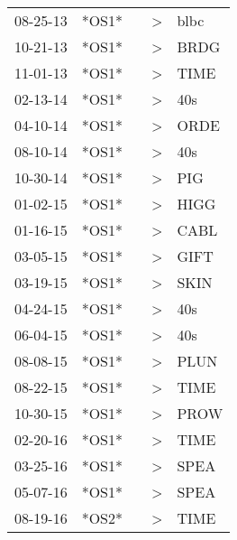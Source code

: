 \begin{supertabular}{p{0.07\textwidth}p{0.06\textwidth}p{0.02\textwidth}p{0.02\textwidth}p{0.06\textwidth}}
 08-25-13\textsuperscript{} &  *OS1* &   &  \textgreater &  blbc\textsuperscript{} \\
 10-21-13\textsuperscript{} &  *OS1* &   &  \textgreater &  BRDG\textsuperscript{} \\
 11-01-13\textsuperscript{} &  *OS1* &   &  \textgreater &  TIME\textsuperscript{} \\
 02-13-14\textsuperscript{} &  *OS1* &   &  \textgreater &   40s\textsuperscript{} \\
 04-10-14\textsuperscript{} &  *OS1* &   &  \textgreater &  ORDE\textsuperscript{} \\
 08-10-14\textsuperscript{} &  *OS1* &   &  \textgreater &   40s\textsuperscript{} \\
 10-30-14\textsuperscript{} &  *OS1* &   &  \textgreater &   PIG\textsuperscript{} \\
 01-02-15\textsuperscript{} &  *OS1* &   &  \textgreater &  HIGG\textsuperscript{} \\
 01-16-15\textsuperscript{} &  *OS1* &   &  \textgreater &  CABL\textsuperscript{} \\
 03-05-15\textsuperscript{} &  *OS1* &   &  \textgreater &  GIFT\textsuperscript{} \\
 03-19-15\textsuperscript{} &  *OS1* &   &  \textgreater &  SKIN\textsuperscript{} \\
 04-24-15\textsuperscript{} &  *OS1* &   &  \textgreater &   40s\textsuperscript{} \\
 06-04-15\textsuperscript{} &  *OS1* &   &  \textgreater &   40s\textsuperscript{} \\
 08-08-15\textsuperscript{} &  *OS1* &   &  \textgreater &  PLUN\textsuperscript{} \\
 08-22-15\textsuperscript{} &  *OS1* &   &  \textgreater &  TIME\textsuperscript{} \\
 10-30-15\textsuperscript{} &  *OS1* &   &  \textgreater &  PROW\textsuperscript{} \\
 02-20-16\textsuperscript{} &  *OS1* &   &  \textgreater &  TIME\textsuperscript{} \\
 03-25-16\textsuperscript{} &  *OS1* &   &  \textgreater &  SPEA\textsuperscript{} \\
 05-07-16\textsuperscript{} &  *OS1* &   &  \textgreater &  SPEA\textsuperscript{} \\
 08-19-16\textsuperscript{} &  *OS2* &   &  \textgreater &  TIME\textsuperscript{} \\

\end{supertabular}
